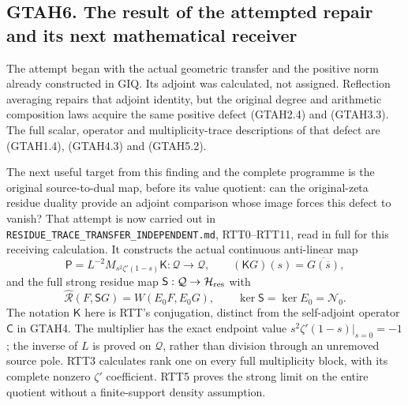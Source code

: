\subsection{GTAH6. The result of the attempted repair and its next
mathematical
receiver}\label{gtah6.-the-result-of-the-attempted-repair-and-its-next-mathematical-receiver}

The attempt began with the actual geometric transfer and the positive
norm already constructed in GIQ. Its adjoint was calculated, not
assigned. Reflection averaging repairs that adjoint identity, but the
original degree and arithmetic composition laws acquire the same
positive defect (GTAH2.4) and (GTAH3.3). The full scalar, operator and
multiplicity-trace descriptions of that defect are (GTAH1.4), (GTAH4.3)
and (GTAH5.2).

The next useful target from this finding and the complete programme is
the original source-to-dual map, before its value quotient: can the
original-zeta residue duality provide an adjoint comparison whose image
forces this defect to vanish? That attempt is now carried out in
\nolinkurl{RESIDUE_TRACE_TRANSFER_INDEPENDENT.md}, RTT0--RTT11, read in
full for this receiving calculation. It constructs the actual continuous
anti-linear map \[
\mathsf P=L^{-2}M_{s^2\zeta'(1-s)}\mathsf K:\mathcal Q\to\mathcal Q,
\qquad (\mathsf KG)(s)=\overline{G(\overline s)},
\tag{GTAH6.1}
\] and the full strong residue map
\(\mathsf S:\mathcal Q\to\mathcal H_{\rm res}\) with \[
\widehat{\mathcal R}(F,\mathsf SG)=W(E_0F,E_0G),
\qquad \ker\mathsf S=\ker E_0=\mathcal N_0.
\tag{GTAH6.2}
\] The notation \(\mathsf K\) here is RTT's conjugation, distinct from
the self-adjoint operator \(\mathsf C\) in GTAH4. The multiplier has the
exact endpoint value \(s^2\zeta'(1-s)|_{s=0}=-1\); the inverse of \(L\)
is proved on \(\mathcal Q\), rather than division through an unremoved
source pole. RTT3 calculates rank one on every full multiplicity block,
with its complete nonzero \(\zeta'\) coefficient. RTT5 proves the strong
limit on the entire quotient without a finite-support density
assumption.

